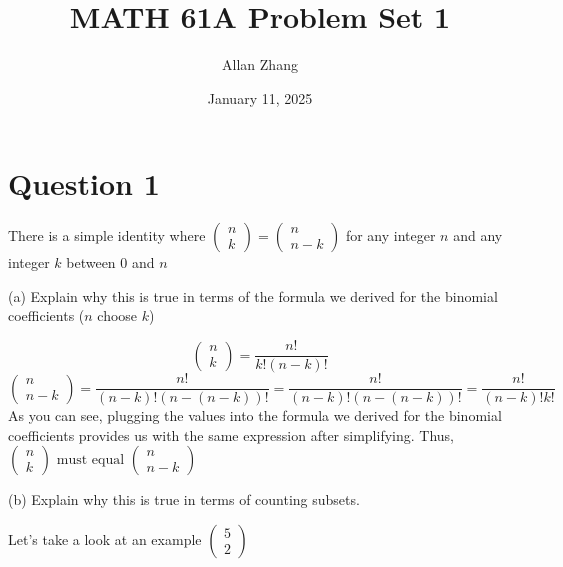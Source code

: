 \documentclass[hidelinks]{article}
\title{\textbf{MATH 61A Problem Set 1}}
\author{Allan Zhang}
\date{January 11, 2025}
\begin{document}
\hypersetup{bookmarksnumbered=true,}
\pagecolor{white}
\color{black}
\maketitle

\section*{Question 1}
There is a simple identity where $\begin{pmatrix}n \\ k \end{pmatrix} = \begin{pmatrix}n \\ n-k \end{pmatrix}$ for any integer $n$ and any integer $k$ between 0 and $n$
\vspace{0.2cm}

(a) Explain why this is true in terms of the formula we derived for the binomial coefficients ($n$ choose $k$)

\[
    \begin{pmatrix}n \\ k \end{pmatrix} = \frac{n!}{k!(n-k)!} 
\]
\[
    \begin{pmatrix}n \\ n-k \end{pmatrix} = \frac{n!}{(n-k)!(n-(n-k))!} =  \frac{n!}{(n-k)!(n-(n-k))!} = \frac{n!}{(n-k)!k!} 
\]
As you can see, plugging the values into the formula we derived for the binomial coefficients provides us with the same expression after simplifying. Thus, $\begin{pmatrix}n \\ k \end{pmatrix} \text{ must equal } \begin{pmatrix}n \\ n-k \end{pmatrix}$
\vspace{0.2cm}

(b) Explain why this is true in terms of counting subsets.

Let's take a look at an example $\begin{pmatrix} 5 \\ 2\end{pmatrix}$ 
\end{document}
